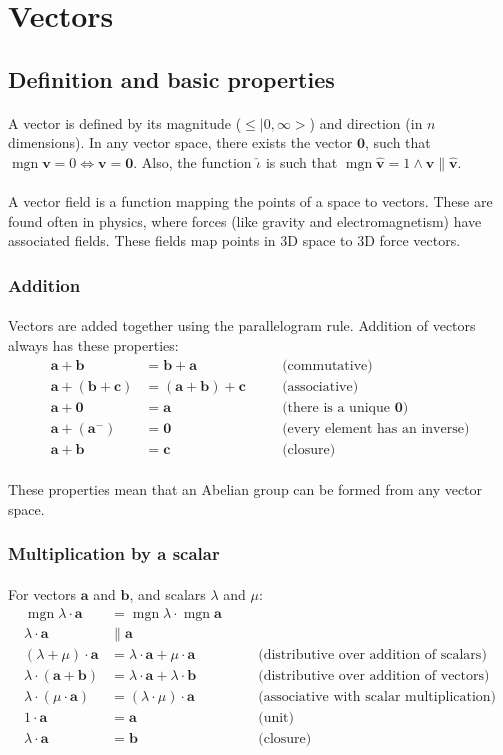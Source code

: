 \documentclass[11pt]{article}
\newcommand*\id{\iota}
\newcommand*\cd{\cdot}
\newcommand*\prg{\paragraph}
\DeclareMathOperator{\mgn}{mgn}
\begin{document}
\section{Vectors}
\subsection{Definition and basic properties}
\prg{}A vector is defined by its magnitude (${\leq}|0,\infty{>}$) and direction (in $n$ dimensions). In any vector space, there exists the vector $\mathbf 0$, such that $\mgn{\mathbf v}=0\iff\mathbf v=\mathbf 0$. Also, the function $\hat\id$ is such that $\mgn{\hat{\mathbf v}}=1\wedge\mathbf v\parallel\hat{\mathbf v}$.

\prg{}A vector field is a function mapping the points of a space to vectors. These are found often in physics, where forces (like gravity and electromagnetism) have associated fields. These fields map points in 3D space to 3D force vectors.

\subsubsection{Addition}
\prg{}Vectors are added together using the parallelogram rule. Addition of vectors always has these properties:
\[
\begin{aligned}
\mathbf a+\mathbf b&=\mathbf b+\mathbf a &&\quad\textrm{(commutative)} \\
\mathbf a+(\mathbf b+\mathbf c)&=(\mathbf a+\mathbf b)+\mathbf c &&\quad\textrm{(associative)} \\
\mathbf a+\mathbf 0&=\mathbf a &&\quad\textrm{(there is a unique $\mathbf 0$)} \\
\mathbf a+(\mathbf a^-)&=\mathbf 0 &&\quad\textrm{(every element has an inverse)} \\
\mathbf a+\mathbf b&=\mathbf c &&\quad\textrm{(closure)}
\end{aligned}
\]
\prg{}These properties mean that an Abelian group can be formed from any vector space.

\subsubsection{Multiplication by a scalar}
\prg{}For vectors $\mathbf a$ and $\mathbf b$, and scalars $\lambda$ and $\mu$:
\[
\begin{aligned}
\mgn{\lambda\cd\mathbf a}&=\mgn\lambda\cd\mgn{\mathbf a} \\
\lambda\cd\mathbf a&\parallel\mathbf a \\
(\lambda+\mu)\cd\mathbf a&=\lambda\cd\mathbf a+\mu\cd\mathbf a &&\quad\textrm{(distributive over addition of scalars)}\\
\lambda\cd(\mathbf a+\mathbf b)&=\lambda\cd\mathbf a+\lambda\cd\mathbf b &&\quad\textrm{(distributive over addition of vectors)}\\
\lambda\cd(\mu\cd\mathbf a)&=(\lambda\cd\mu)\cd\mathbf a &&\quad\textrm{(associative with scalar multiplication)}\\
1\cd\mathbf a&=\mathbf a &&\quad\textrm{(unit)}\\
\lambda\cd\mathbf a&=\mathbf b &&\quad\textrm{(closure)}
\end{aligned}
\]
\end{document}
